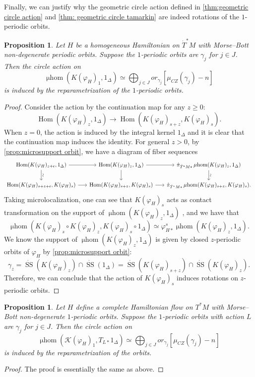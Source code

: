 \documentclass[11pt]{amsart}
\numberwithin{equation}{section}
\theoremstyle{plain}
\newtheorem{Prop}[prop]{Proposition}
\theoremstyle{definition}
\theoremstyle{remark}
\newcommand{\cK} { {\mathcal{K}}}
\newcommand\Hom{\operatorname{Hom}}
\newcommand\mhom{\operatorname{\mu hom}}
\newcommand\ms{\operatorname{SS}}
\begin{document}
Finally, we can justify why the geometric circle action defined in \autoref{thm:geometric circle action} and \autoref{thm: geometric circle tamarkin} are indeed rotations of the $1$-periodic orbits.

\begin{Prop}
Let $H$ be a homogeneous Hamiltonian on $\dot T^*M$ with Morse--Bott non-degenerate periodic orbits. 
Suppose the $1$-periodic orbits are $\gamma_j$ for $j \in J$. Then the circle action on
\[\mhom(K(\varphi_{H})_1, 1_\Delta) \simeq \bigoplus_{j\in J}or_{\gamma_j}[\mu_{CZ}(\gamma_j)-n]\]
is induced by the reparametrization of the $1$-periodic orbits.
\end{Prop}
\begin{proof}
Consider the action by the continuation map for any $z \geq 0$:
\[\Hom(K(\varphi_H)_z, 1_\Delta) \to \Hom(K(\varphi_H)_{s+z}, K(\varphi_H)_{s}).\]
When $z = 0$, the action is induced by the integral kernel $1_\Delta$ and it is clear that the continuation map induces the identity.
For general $z > 0$, by \autoref{prop:microsupport orbit}, we have a diagram of fiber sequences
\[\begin{tikzcd}[column sep=16pt]
    \Hom(K(\varphi_H)_{z+\epsilon}, 1_\Delta) \ar[r] \ar[d, "\rotatebox{90}{$\sim$}"] & \Hom(K(\varphi_H)_{z}, 1_\Delta) \ar[r] \ar[d] & \dot{\pi}_{\dot T^*M*}\mhom(K(\varphi_H)_{z}, 1_\Delta) \ar[d, "\rotatebox{90}{$\sim$}"] \\
    \Hom(K(\varphi_H)_{s+z+\epsilon}, K(\varphi_H)_{s}) \ar[r] & \Hom(K(\varphi_H)_{s+z}, K(\varphi_H)_{s}) \ar[r] & \dot{\pi}_{\dot T^*M*}\mhom(K(\varphi_H)_{s+z}, K(\varphi_H)_{s}).
\end{tikzcd}\]
Taking microlocalization, one can see that $K(\varphi_H)_s$ acts as contact transformation on the support of $\mhom(K(\varphi_H)_z, 1_\Delta)$ \cite[Theorem 7.2.1]{KS90}, and we have that 
\[\mhom(K(\varphi_H)_s \circ K(\varphi_H)_z, K(\varphi_H)_s \circ 1_\Delta) \simeq \varphi_{H*}^s\mhom(K(\varphi_H)_z, 1_\Delta).\]
We know the support of $\mhom(K(\varphi_H)_z, 1_\Delta)$ is given by closed $z$-periodic orbits of $\varphi_H$ by \autoref{prop:microsupport orbit}:
\[\gamma_z = \dot{\ms}(K(\varphi_H)_z) \cap \dot{\ms}(1_\Delta) = \dot{\ms}(K(\varphi_H)_{s+z}) \cap \dot{\ms}(K(\varphi_H)_z).\]
Therefore, we can conclude that the action of $K(\varphi_H)_s$ induces rotations on $z$-periodic orbits.
\end{proof}

\begin{Prop}
Let $H$ define a complete Hamiltonian flow on $T^*M$ with Morse--Bott non-degenerate $1$-periodic orbits. 
Suppose the $1$-periodic orbits with action $L$ are $\gamma_j$ for $j \in J$. Then the circle action on
\[\mhom(\cK(\varphi_{H})_1, T_{L*}1_\Delta) \simeq \bigoplus_{j\in J}or_{\gamma_j}[\mu_{CZ}(\gamma_j)-n]\]
is induced by the reparametrization of the orbits.
\end{Prop}
\begin{proof}
The proof is essentially the same as above.
\end{proof}
\end{document}
